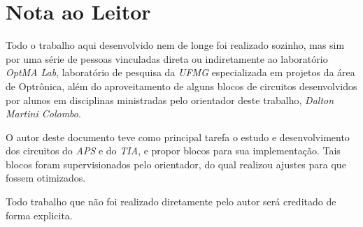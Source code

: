 \chapter*[Nota ao Leitor]{Nota ao Leitor}

Todo o trabalho aqui desenvolvido nem de longe foi realizado sozinho, mas sim por uma série de pessoas vinculadas direta ou indiretamente ao laboratório 
\emph{OptMA Lab}, laboratório de pesquisa da \emph{UFMG} especializada em projetos da área de Optrônica, além do aproveitamento de alguns blocos de circuitos desenvolvidos por alunos em disciplinas ministradas pelo orientador deste trabalho, \emph{Dalton Martini Colombo}.

O autor deste documento teve como principal tarefa o estudo e desenvolvimento dos circuitos do \emph{APS} e do \emph{TIA}, e propor blocos para sua implementação. Tais blocos foram supervisionados pelo orientador, do qual realizou ajustes para que fossem otimizados.

Todo trabalho que não foi realizado diretamente pelo autor será creditado de forma explicita.